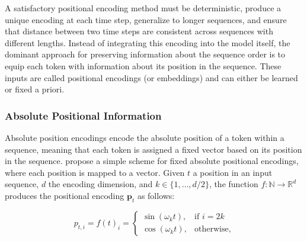 A satisfactory positional encoding method must be deterministic, produce a unique encoding at each time step, generalize to longer sequences, and ensure that distance between two time steps are consistent across sequences with different lengths. Instead of integrating this encoding into the model itself, the dominant approach for preserving information about the sequence order is to equip each token with information about its position in the sequence. These inputs are called positional encodings (or embeddings) and can either be learned or fixed a priori. %

\subsubsection{Absolute Positional Information}



Absolute position encodings encode the absolute position of a token within a sequence, meaning that each token is assigned a fixed vector based on its position in the sequence. \citet{vaswani2017attention} propose a simple scheme for fixed absolute positional encodings, where each position is mapped to a vector. Given $t$ a position in an input sequence, $d$ the encoding dimension, and $k \in \{1, \ldots, d/2\}$, the function $f: \mathbb{N} \rightarrow \mathbb{R}^d$ produces the positional encoding $\bm{p}_t$ as follows:

\begin{equation}
    p_{t,i} = f(t)_i = 
\begin{cases}
    \sin(\omega_k t), & \text{if } i=2k\\
    \cos(\omega_k t),              & \text{otherwise},
\end{cases}
\end{equation}

